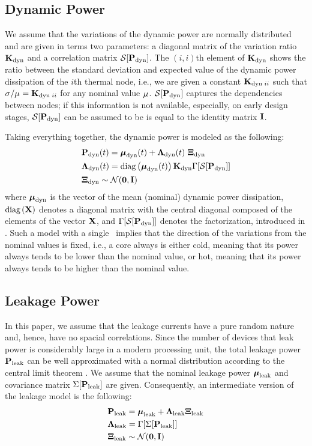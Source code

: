 \subsection{Dynamic Power}
We assume that the variations of the dynamic power are normally distributed and are given in terms two parameters: a diagonal matrix of the variation ratio $\mathbf{K}_{\text{dyn}}$ and a correlation matrix $\mathcal{S}[{\mathbf{P}_{\text{dyn}}}]$. The $(i,i)$th element of $\mathbf{K}_{\text{dyn}}$ shows the ratio between the standard deviation and expected value of the dynamic power dissipation of the $i$th thermal node, i.e., we are given a constant $\mathbf{K}_{\text{dyn} \; ii}$ such that $\sigma_{}/\mu_{} = \mathbf{K}_{\text{dyn} \; ii}$ for any nominal value $\mu_{}$. $\mathcal{S}[{\mathbf{P}_{\text{dyn}}}]$ captures the dependencies between nodes; if this information is not available, especially, on early design stages, $\mathcal{S}[{\mathbf{P}_{\text{dyn}}}]$ can be assumed to be is equal to the identity matrix $\mathbf{I}$.

Taking everything together, the dynamic power is modeled as the following:
\begin{align} \equlabel{dynamic-power}
  & \vpower_\dyn(\time) = \vmean{\dyn}(\time) + \ddev{\dyn}(\time) \; \vnormal_\dyn \\
  & \ddev{\dyn}(\time) = \diag{\vmean{\dyn}(\time)} \mratio_\dyn \factorize{\corr{\vpower_\dyn}} \nonumber \\
  & \vnormal_\dyn \sim \normal(\vzero, \mone) \nonumber
\end{align}
where $\boldsymbol\mu_{\text{dyn}}$ is the vector of the mean (nominal) dynamic power dissipation, $\text{diag}\left(\mathbf{X}\right)$ denotes a diagonal matrix with the central diagonal composed of the elements of the vector $\mathbf{X}$, and $\Gamma[\mathcal{S}[{\mathbf{P}_{\text{dyn}}}]]$ denotes the factorization, introduced in . Such a model with a single \mrv\ implies that the direction of the variations from the nominal values is fixed, i.e., a core always is either cold, meaning that its power always tends to be lower than the nominal value, or hot, meaning that its power always tends to be higher than the nominal value.

\subsection{Leakage Power}
In this paper, we assume that the leakage currents have a pure random nature and, hence, have no spacial correlations. Since the number of devices that leak power is considerably large in a modern processing unit, the total leakage power $\mathbf{P}_{\text{leak}}$ can be well approximated with a normal distribution \cite{srivastava2010} according to the central limit theorem \cite{durrett2010}. We assume that the nominal leakage power $\boldsymbol\mu_{\text{leak}}$ and covariance matrix $\Sigma[\mathbf{P}_{\text{leak}}]$ are given. Consequently, an intermediate version of the leakage model is the following:
\begin{align*}
  & \mathbf{P}_{\text{leak}} = \boldsymbol\mu_{\text{leak}} + \mathbf{\Lambda}_{\text{leak}} \mathbf{\Xi}_{\text{leak}} \\
  & \mathbf{\Lambda}_{\text{leak}} = \Gamma[\Sigma[\mathbf{P}_{\text{leak}}]] \\
  & \mathbf{\Xi}_{\text{leak}} \sim \mathcal{N}(\mathbf{0}, \mathbf{I})
\end{align*}

